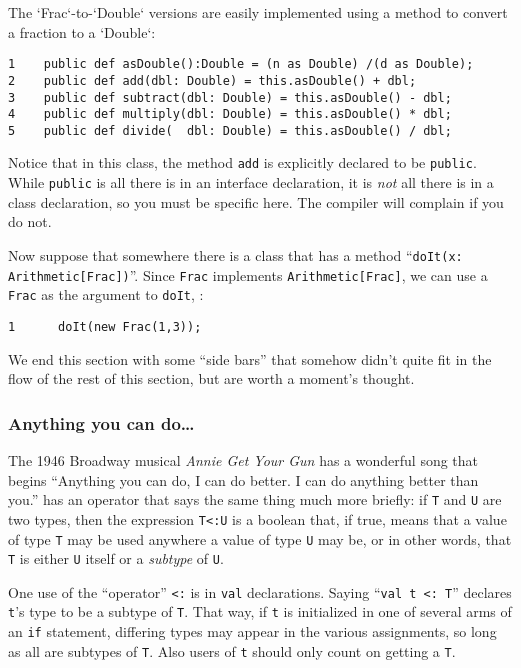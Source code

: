 The \xcd`Frac`-to-\xcd`Double` versions are easily implemented using 
a method to convert a fraction to a \xcd`Double`: 

\begin{verbatim}
1    public def asDouble():Double = (n as Double) /(d as Double);
2    public def add(dbl: Double) = this.asDouble() + dbl;
3    public def subtract(dbl: Double) = this.asDouble() - dbl;
4    public def multiply(dbl: Double) = this.asDouble() * dbl;
5    public def divide(  dbl: Double) = this.asDouble() / dbl;
\end{verbatim}


Notice that in this class, the method {\tt add} is explicitly declared to be
{\tt public}.  While {\tt public} is all there is in an interface declaration,
it is {\em not} all there is in a class declaration, so you must be specific
here.  The compiler will complain if you do not.

Now suppose that somewhere there is a class that has a method ``{\tt doIt(x:
Arith\-me\-tic[Frac])}''. Since {\tt Frac} implements {\tt Arithmetic[Frac]},
we can use a {\tt Frac} as the argument to {\tt doIt}, \eg:

\begin{verbatim}
1      doIt(new Frac(1,3));
\end{verbatim}



We end this section with some ``side bars'' that somehow didn't quite fit in 
the flow of the rest of this section, but are worth a moment's thought.

\subsubsection{ Anything you can do\ldots}\label{subsub:type:anything}
The 1946 Broadway musical {\em Annie Get Your
Gun} has a wonderful song that begins ``Anything you can do, I can do better. 
I can do anything better than you.''  \Xten{} has an operator that says the
same thing much more briefly: if {\tt T} and {\tt U} are two types, then the
expression {\tt T<:U} is a boolean that, if true, means that a value of type
{\tt T} may be used anywhere a value of type {\tt U} may be, or in other words,
that {\tt T} is either {\tt U} itself or a {\em subtype} of {\tt U}. 

One use of the ``operator'' {\tt <:} is in {\tt val} declarations. 
Saying ``{\tt val t <: T}'' declares {\tt t}'s type to be a subtype of {\tt T}. 
That way, if {\tt t} is initialized in one of several arms of an {\tt if}
statement, differing types may appear in the various assignments, so long as all
are subtypes of {\tt T}.  Also users of {\tt t} should only count on getting a
{\tt T}.

